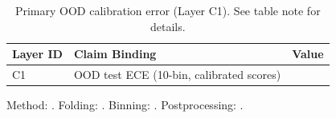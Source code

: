 \begin{table}[H]
\centering
\caption[Primary OOD Calibration Error]{Primary OOD calibration error (Layer C1). See table note for details.}
\label{tab:calibration_primary_ood}
\renewcommand{\arraystretch}{1.2}
\begin{tabular}{lll}
\toprule
\textbf{Layer ID} & \textbf{Claim Binding} & \textbf{Value} \\
\midrule
C1 & OOD test ECE (10-bin, calibrated scores) & \textbf{\metricECEOODBootstrapCalibrated{}} \\
\bottomrule
\end{tabular}
\vspace{0.5em}
\begin{minipage}{0.95\linewidth}
\footnotesize Method: \metricCalibrationPrimaryMethod{}. Folding: \metricCalibrationPrimaryFolding{}. Binning: \metricCalibrationPrimaryBinning{}. Postprocessing: \metricCalibrationPrimaryPostprocess{}.
\end{minipage}
\end{table}
